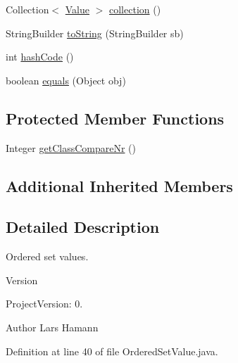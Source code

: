 \begin{DoxyCompactItemize}
\item 
Collection$<$ \hyperlink{classorg_1_1tzi_1_1use_1_1uml_1_1ocl_1_1value_1_1_value}{Value} $>$ \hyperlink{classorg_1_1tzi_1_1use_1_1uml_1_1ocl_1_1value_1_1_ordered_set_value_a87aa18b1a4436effe83ac744bd9addbb}{collection} ()
\item 
String\-Builder \hyperlink{classorg_1_1tzi_1_1use_1_1uml_1_1ocl_1_1value_1_1_ordered_set_value_a29178de1bb238700220d6a587404fea0}{to\-String} (String\-Builder sb)
\item 
int \hyperlink{classorg_1_1tzi_1_1use_1_1uml_1_1ocl_1_1value_1_1_ordered_set_value_a10fe4a4dcd3ad89f844906e13e2a3bc7}{hash\-Code} ()
\item 
boolean \hyperlink{classorg_1_1tzi_1_1use_1_1uml_1_1ocl_1_1value_1_1_ordered_set_value_ad8f366be2838aca51b397f2ab000ed35}{equals} (Object obj)
\end{DoxyCompactItemize}
\subsection*{Protected Member Functions}
\begin{DoxyCompactItemize}
\item 
Integer \hyperlink{classorg_1_1tzi_1_1use_1_1uml_1_1ocl_1_1value_1_1_ordered_set_value_aa2ee44e7041bb057d065a6c2091c9763}{get\-Class\-Compare\-Nr} ()
\end{DoxyCompactItemize}
\subsection*{Additional Inherited Members}


\subsection{Detailed Description}
Ordered set values.

\begin{DoxyVersion}{Version}

\end{DoxyVersion}
\begin{DoxyParagraph}{Project\-Version\-:}
0. 
\end{DoxyParagraph}
\begin{DoxyAuthor}{Author}
Lars Hamann 
\end{DoxyAuthor}


Definition at line 40 of file Ordered\-Set\-Value.\-java.



